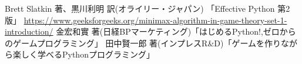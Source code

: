 \documentclass[uplatex,a4paper,11pt,oneside,openany]{jsbook}
\begin{document}

\newpage
%
%
\begin{thebibliography}{99}
 Brett Slatkin 著、黒川利明 訳(オライリー・ジャパン) 「Effective Python 第2版」
 \url{https://www.geeksforgeeks.org/minimax-algorithm-in-game-theory-set-1-introduction/}
 金宏和實 著(日経BPマーケティング)「はじめるPython!,ゼロからのゲームプログラミング」
 田中賢一郎 著(インプレスR\&D)「ゲームを作りながら楽しく学べるPythonプログラミング」
\end{thebibliography}
%
\end{document}
